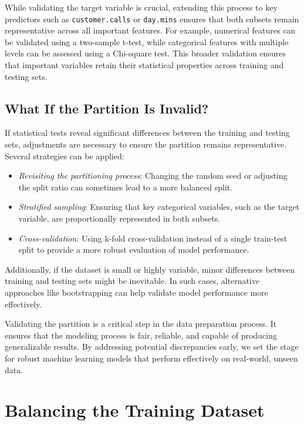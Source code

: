 \documentclass[
  11pt,
]{book}
\newcommand{\passthrough}[1]{#1}
\providecommand{\tightlist}{%
  \setlength{\itemsep}{0pt}\setlength{\parskip}{0pt}}
\theoremstyle{definition}
\theoremstyle{definition}
\theoremstyle{definition}
\theoremstyle{definition}
\theoremstyle{remark}
\begin{document}
While validating the target variable is crucial, extending this process to key predictors such as \passthrough{\lstinline!customer.calls!} or \passthrough{\lstinline!day.mins!} ensures that both subsets remain representative across all important features. For example, numerical features can be validated using a two-sample t-test, while categorical features with multiple levels can be assessed using a Chi-square test. This broader validation ensures that important variables retain their statistical properties across training and testing sets.

\subsection*{What If the Partition Is Invalid?}\label{what-if-the-partition-is-invalid}


If statistical tests reveal significant differences between the training and testing sets, adjustments are necessary to ensure the partition remains representative. Several strategies can be applied:

\begin{itemize}
\tightlist
\item
  \emph{Revisiting the partitioning process}: Changing the random seed or adjusting the split ratio can sometimes lead to a more balanced split.
\item
  \emph{Stratified sampling}: Ensuring that key categorical variables, such as the target variable, are proportionally represented in both subsets.
\item
  \emph{Cross-validation}: Using k-fold cross-validation instead of a single train-test split to provide a more robust evaluation of model performance.
\end{itemize}

Additionally, if the dataset is small or highly variable, minor differences between training and testing sets might be inevitable. In such cases, alternative approaches like bootstrapping can help validate model performance more effectively.

Validating the partition is a critical step in the data preparation process. It ensures that the modeling process is fair, reliable, and capable of producing generalizable results. By addressing potential discrepancies early, we set the stage for robust machine learning models that perform effectively on real-world, unseen data.

\section{Balancing the Training Dataset}\label{balancing-the-training-dataset}
\end{document}
